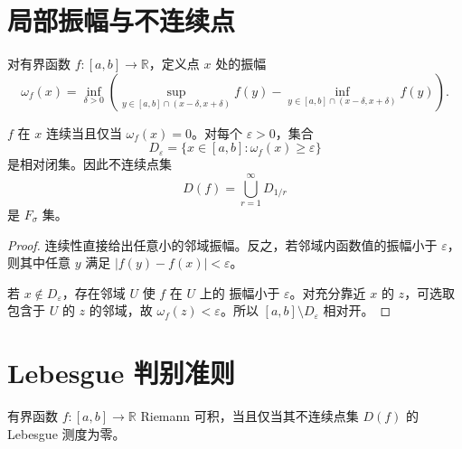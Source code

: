 \section{局部振幅与不连续点}

对有界函数 \(f:[a,b]\to\mathbb R\)，定义点 \(x\) 处的振幅
\[
 \omega_f(x)
 =\inf_{\delta>0}
 \left(
 \sup_{y\in[a,b]\cap(x-\delta,x+\delta)}f(y)
 -\inf_{y\in[a,b]\cap(x-\delta,x+\delta)}f(y)
 \right).
\]

\begin{proposition}
\label{prop:oscillation-continuity}
\(f\) 在 \(x\) 连续当且仅当 \(\omega_f(x)=0\)。对每个
\(\varepsilon>0\)，集合
\[
 D_\varepsilon=\{x\in[a,b]:\omega_f(x)\ge\varepsilon\}
\]
是相对闭集。因此不连续点集
\[
 D(f)=\bigcup_{r=1}^{\infty}D_{1/r}
\]
是 \(F_\sigma\) 集。
\end{proposition}

\begin{proof}
连续性直接给出任意小的邻域振幅。反之，若邻域内函数值的振幅小于
\(\varepsilon\)，则其中任意 \(y\) 满足
\(|f(y)-f(x)|<\varepsilon\)。

若 \(x\notin D_\varepsilon\)，存在邻域 \(U\) 使 \(f\) 在 \(U\) 上的
振幅小于 \(\varepsilon\)。对充分靠近 \(x\) 的 \(z\)，可选取包含于
\(U\) 的 \(z\) 的邻域，故 \(\omega_f(z)<\varepsilon\)。所以
\([a,b]\setminus D_\varepsilon\) 相对开。
\end{proof}

\section{Lebesgue 判别准则}

\begin{theorem}
\label{thm:lebesgue-riemann-criterion}
有界函数 \(f:[a,b]\to\mathbb R\) Riemann 可积，当且仅当其不连续点集
\(D(f)\) 的 Lebesgue 测度为零。
\end{theorem}

